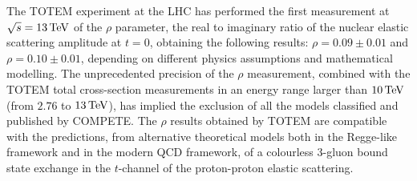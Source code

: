 The TOTEM experiment at the LHC has performed the first measurement at $\sqrt s = 13\,{\rm TeV}$ of the $\rho$ parameter, the real to imaginary ratio of the nuclear elastic scattering amplitude at $t=0$, obtaining the following results: $\rho = 0.09 \pm 0.01$ and $\rho = 0.10 \pm 0.01$, depending on different physics assumptions and mathematical modelling. The unprecedented precision of the $\rho$ measurement, combined with the TOTEM total cross-section measurements in an energy range larger than $10\,{\rm TeV}$ (from $2.76$ to $13\,{\rm TeV}$), has implied the exclusion of all the models classified and published by COMPETE. The $\rho$ results obtained by TOTEM are compatible with the predictions, from alternative theoretical models both in the Regge-like framework and in the modern QCD framework, of a colourless 3-gluon bound state exchange in the $t$-channel of the proton-proton elastic scattering.
